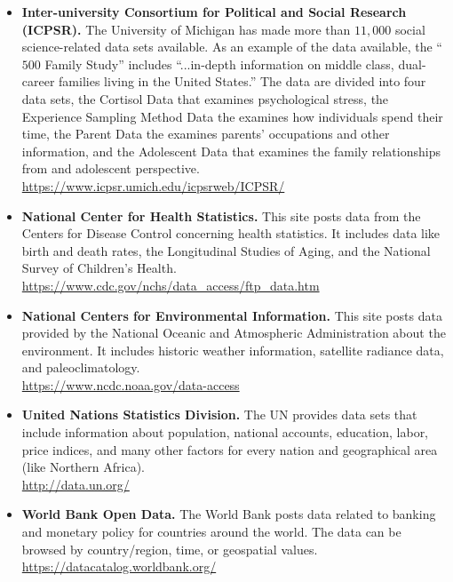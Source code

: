 \begin{itemize}
	\item \textbf{Inter-university Consortium for Political and Social Research (ICPSR).} The University of Michigan has made more than $ 11,000 $ social science-related data sets available. As an example of the data available, the ``$ 500 $ Family Study'' includes ``...in-depth information on middle class, dual-career families living in the United States.'' The data are divided into four data sets, the Cortisol Data that examines psychological stress, the Experience Sampling Method Data the examines how individuals spend their time, the Parent Data the examines parents' occupations and other information, and the Adolescent Data that examines the family relationships from and adolescent perspective.
	\\ \url{https://www.icpsr.umich.edu/icpsrweb/ICPSR/}

	\item \textbf{National Center for Health Statistics.} This site posts data from the Centers for Disease Control concerning health statistics. It includes data like birth and death rates, the Longitudinal Studies of Aging, and the National Survey of Children's Health.
	\\ \url{https://www.cdc.gov/nchs/data_access/ftp_data.htm}

	\item \textbf{National Centers for Environmental Information.} This site posts data provided by the National Oceanic and Atmospheric Administration about the environment. It includes historic weather information, satellite radiance data, and paleoclimatology.
	\\ \url{https://www.ncdc.noaa.gov/data-access}

	\item \textbf{United Nations Statistics Division.} The UN provides data sets that include information about population, national accounts, education, labor, price indices, and many other factors for every nation and geographical area (like Northern Africa). 
	\\ \url{http://data.un.org/}

	\item \textbf{World Bank Open Data.} The World Bank posts data related to banking and monetary policy for countries around the world. The data can be browsed by country/region, time, or geospatial values.
	\\ \url{https://datacatalog.worldbank.org/}
	
\end{itemize}

